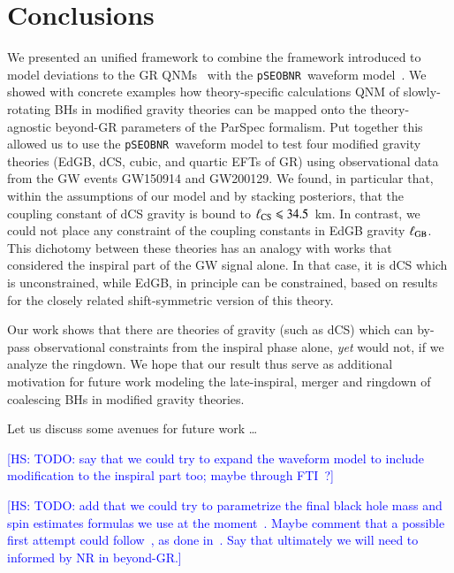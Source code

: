 \documentclass[twocolumn,
               prd,
               aps,
               superscriptaddress,
               tightenlines,
               nofootinbib,
               eqsecnum,
               amsfonts,
               amsmath,
               longbibliography]{revtex4-1}
\newcommand{\pSEOB}{\texttt{pSEOBNR}}
\newcommand{\hs}[1]{{\textcolor{blue}{{[HS: #1]}} }}
\begin{document}
\section{Conclusions}
\label{sec:conclusions}


We presented an unified framework to combine the framework introduced
to model deviations to the GR QNMs~\cite{Maselli:2019mjd} with the \pSEOB~waveform model~\cite{Brito:2018rfr,Ghosh:2021mrv}.
%
We showed with concrete examples how theory-specific calculations QNM of
slowly-rotating BHs in modified gravity theories can be mapped onto the
theory-agnostic beyond-GR parameters of the ParSpec formalism.
%
Put together this allowed us to use the \pSEOB~waveform model to test four
modified gravity theories (EdGB, dCS, cubic, and quartic EFTs of GR) using
observational data from the GW events GW150914 and GW200129.
%
We found, in particular that, within the assumptions of our model and by
stacking posteriors, that the coupling constant of dCS gravity is bound to
$\ell_{\rm CS} \leqslant 34.5$~km.
%
In contrast, we could not place any constraint of the coupling constants in EdGB gravity $\ell_{\rm GB}$.
%
This dichotomy between these theories has an analogy with works that considered
the inspiral part of the GW signal alone.
%
In that case, it is dCS which is unconstrained, while EdGB, in principle can be
constrained, based on results for the closely related shift-symmetric version
of this theory.

Our work shows that there are theories of gravity (such as dCS) which can by-pass observational
constraints from the inspiral phase alone, {\it yet} would not, if we
analyze the ringdown.
%
We hope that our result thus serve as additional motivation for future work
modeling the late-inspiral, merger and ringdown of coalescing BHs in modified
gravity theories.

Let us discuss some avenues for future work \dots

\hs{TODO: say that we could try to expand the waveform model to include modification to
the inspiral part too; maybe through FTI~\cite{Mehta:2022pcn}?}

\hs{TODO: add that we could try to parametrize the final black hole mass and spin estimates formulas we
use at the moment~\cite{Hofmann:2016yih}. Maybe comment that a possible first attempt could follow~\cite{Buonanno:2007sv},
as done in~\cite{Jai-akson:2017ldo,Li:2020wse}. Say that ultimately we will need to informed by NR in beyond-GR.}
\end{document}
